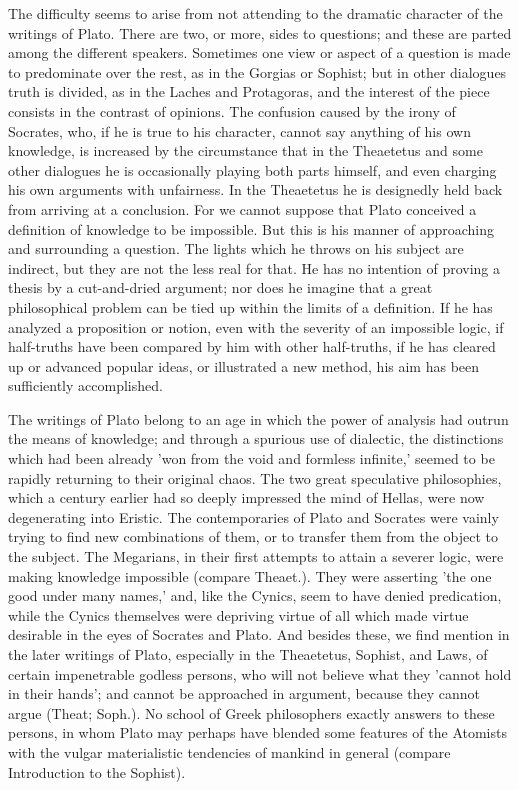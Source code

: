 The difficulty seems to arise from not attending to the dramatic
character of the writings of Plato. There are two, or more, sides to
questions; and these are parted among the different speakers. Sometimes
one view or aspect of a question is made to predominate over the rest,
as in the Gorgias or Sophist; but in other dialogues truth is divided,
as in the Laches and Protagoras, and the interest of the piece consists
in the contrast of opinions. The confusion caused by the irony of
Socrates, who, if he is true to his character, cannot say anything
of his own knowledge, is increased by the circumstance that in the
Theaetetus and some other dialogues he is occasionally playing both
parts himself, and even charging his own arguments with unfairness. In
the Theaetetus he is designedly held back from arriving at a conclusion.
For we cannot suppose that Plato conceived a definition of knowledge to
be impossible. But this is his manner of approaching and surrounding a
question. The lights which he throws on his subject are indirect, but
they are not the less real for that. He has no intention of proving a
thesis by a cut-and-dried argument; nor does he imagine that a great
philosophical problem can be tied up within the limits of a definition.
If he has analyzed a proposition or notion, even with the severity of
an impossible logic, if half-truths have been compared by him with
other half-truths, if he has cleared up or advanced popular ideas, or
illustrated a new method, his aim has been sufficiently accomplished.

The writings of Plato belong to an age in which the power of analysis
had outrun the means of knowledge; and through a spurious use of
dialectic, the distinctions which had been already 'won from the void
and formless infinite,' seemed to be rapidly returning to their original
chaos. The two great speculative philosophies, which a century earlier
had so deeply impressed the mind of Hellas, were now degenerating into
Eristic. The contemporaries of Plato and Socrates were vainly trying to
find new combinations of them, or to transfer them from the object to
the subject. The Megarians, in their first attempts to attain a severer
logic, were making knowledge impossible (compare Theaet.). They were
asserting 'the one good under many names,' and, like the Cynics, seem
to have denied predication, while the Cynics themselves were depriving
virtue of all which made virtue desirable in the eyes of Socrates and
Plato. And besides these, we find mention in the later writings of
Plato, especially in the Theaetetus, Sophist, and Laws, of certain
impenetrable godless persons, who will not believe what they 'cannot
hold in their hands'; and cannot be approached in argument, because they
cannot argue (Theat; Soph.). No school of Greek philosophers exactly
answers to these persons, in whom Plato may perhaps have blended some
features of the Atomists with the vulgar materialistic tendencies of
mankind in general (compare Introduction to the Sophist).

